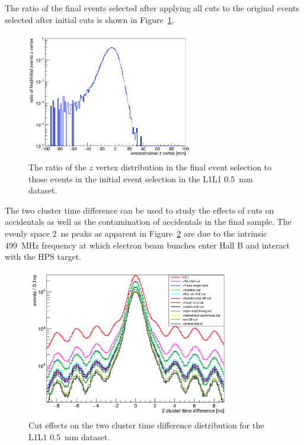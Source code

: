The ratio of the final events selected after applying all cuts to the original events selected after initial cuts is shown in Figure~\ref{fig:l1l1_vtxR}.

\begin{figure}[htb]
  \centering
      \includegraphics[width=0.65\textwidth]{pics/searching/ratio_zvtx_cuts.png}
  \caption[Ratio of final to initial $z$ vertex events]{The ratio of the $z$ vertex distribution in the final event selection to those events in the initial event selection in the L1L1 0.5~mm dataset.}
  \label{fig:l1l1_vtxR}
\end{figure} 

The two cluster time difference can be used to study the effects of cuts on accidentals as well as the contamination of accidentals in the final sample. The evenly space 2~ns peaks as apparent in Figure~\ref{fig:l1l1_tdiff} are due to the intrinsic 499~MHz frequency at which electron beam bunches enter Hall B and interact with the HPS target. 

\begin{figure}[htb]
  \centering
      \includegraphics[width=0.8\textwidth]{pics/searching/L1L1_tdiff.png}
  \caption[Cut effects on the time difference between two clusters]{Cut effects on the two cluster time difference distribution for the L1L1 0.5~mm dataset.}
  \label{fig:l1l1_tdiff}
\end{figure} 

